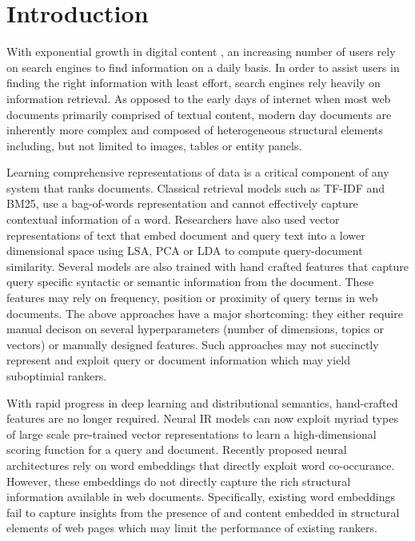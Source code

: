 \documentclass[runningheads,a4paper]{llncs}
\begin{document}
\section{Introduction}
\label{sec:introduction}
With exponential growth in digital content , an increasing number of users rely 
on search engines to find information on a daily basis. In order to assist users 
in finding the right information with least effort, search engines rely heavily 
on information retrieval. As opposed to the early days of 
internet when most web documents primarily comprised of textual content, modern 
day documents are inherently more complex and composed of heterogeneous 
structural elements including, but not limited to images, tables or entity 
panels.

Learning comprehensive representations of data is a critical component of any 
system that ranks documents. Classical retrieval models such as TF-IDF and BM25, 
use a bag-of-words representation and cannot effectively capture contextual 
information of a word. Researchers have also used vector representations of text 
that embed document and query text into a lower dimensional space using 
LSA\cite{deerwester1990indexing}, PCA\cite{jolliffe1986principal} 
or LDA\cite{blei2003latent} to compute query-document similarity. Several models are also 
trained with hand crafted features \cite{Cao2006Sigir,Burges2010Report,Chapelle2011Yahoo} 
that capture query specific syntactic or semantic information from the document. 
These features may rely on frequency, position or proximity of query terms in web documents. 
The above approaches have a major shortcoming: they either require manual decison on several 
hyperparameters (number of dimensions, topics or vectors) or manually 
designed features. Such approaches may not succinctly represent and exploit query 
or document information which may yield suboptimial rankers. 


With rapid progress 
in deep learning and distributional semantics, hand-crafted features are no 
longer required. Neural IR models can now exploit myriad types of large 
scale pre-trained vector representations to learn a high-dimensional scoring 
function for a query and document.
Recently proposed neural architectures \cite{zheng2015learning,zamani2016estimating,mitra2015query} 
rely on word embeddings that directly 
exploit word co-occurance. However, these embeddings do not 
directly capture the rich structural information available in web documents.  
Specifically, existing word embeddings fail to capture insights 
from the presence of and content embedded in structural elements of web pages 
which may limit the performance of existing rankers. 
\end{document}
